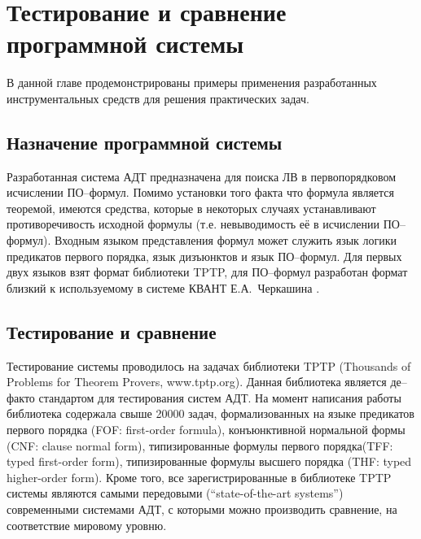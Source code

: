 \chapter{Тестирование и сравнение программной системы}
\label{part:examples}

В данной главе продемонстрированы примеры применения разработанных инструментальных средств  для решения практических задач.

\section{Назначение программной системы}
Разработанная система АДТ предназначена для поиска ЛВ в первопорядковом исчислении ПО--формул. Помимо установки того факта что формула является теоремой, имеются средства, которые в некоторых случаях устанавливают противоречивость исходной формулы (т.е. невыводимость её в исчислении ПО--формул). Входным языком представления формул может служить язык логики предикатов первого порядка, язык дизъюнктов и язык ПО--формул. Для первых двух языков взят формат библиотеки TPTP, для ПО--формул разработан формат близкий к используемому в системе КВАНТ Е.А.~Черкашина \cite{dissChe}. %




\section{Тестирование и сравнение}

Тестирование системы проводилось на задачах библиотеки TPTP (Thou\-sands of Problems for Theorem Provers, www.tptp.org). Данная библиотека является де--факто стандартом для тестирования систем АДТ. На момент написания работы библиотека содержала свыше 20000 задач, формализованных на языке предикатов первого порядка (FOF: first-order formula), конъюнктивной нормальной формы (CNF: clause normal form), типизированные формулы первого порядка(TFF: typed first-order form), типизированные формулы высшего порядка (THF: typed higher-order form). Кроме того, все зарегистрированные в библиотеке TPTP системы являются самыми передовыми (``state-of-the-art systems'') современными системами АДТ, с которыми можно производить сравнение, на соответствие мировому уровню.

